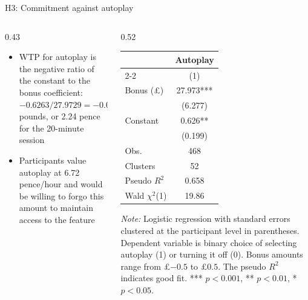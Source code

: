\documentclass[aspectratio=169,xcolor=dvipsnames]{beamer}
\renewcommand{\footnotesize}{\fontsize{8pt}{11pt}\selectfont}
\begin{document}
\begin{frame}{H3: Commitment against autoplay}
  \begin{columns}[T]
    \begin{column}{0.43\textwidth}
      \begin{itemize} %
        \item WTP for autoplay is the negative ratio of the constant to the bonus coefficient: $-0.6263/27.9729 = -0.0224$ pounds, or 2.24 pence for the 20-minute session
        \item Participants value autoplay at 6.72 pence/hour and would be willing to forgo this amount to maintain access to the feature
      \end{itemize}
    \end{column}
    \begin{column}{0.52\textwidth}
      \begin{table}
        \centering
        \footnotesize  %
        \begin{threeparttable}
          \begin{tabular*}{\columnwidth}{@{\extracolsep{\fill}}lc}
            \toprule
            & Autoplay\\
            \cmidrule(lr){2-2}
            & (1) \\
            \midrule
            Bonus (£) & 27.973*** \\
            & (6.277) \\
            Constant & 0.626** \\
            & (0.199) \\
            \midrule
            Obs. & 468 \\
            Clusters & 52 \\
            Pseudo $R^2$ & 0.658 \\
            Wald $\chi^2$(1) & 19.86 \\
            \bottomrule
          \end{tabular*}
          \begin{tablenotes}[flushleft]
            \footnotesize
            \tiny
            \item[] \textit{Note:} Logistic regression with standard errors clustered at the participant level in parentheses. Dependent variable is binary choice of selecting autoplay (1) or turning it off (0). Bonus amounts range from £$-0.5$ to £$0.5$. The pseudo $R^2$ indicates good fit. *** $p<0.001$, ** $p<0.01$, * $p<0.05$.
          \end{tablenotes}
        \end{threeparttable}
        \label{tab:wtp_autoplay}
      \end{table}
    \end{column}
  \end{columns}
\end{frame}
\end{document}

